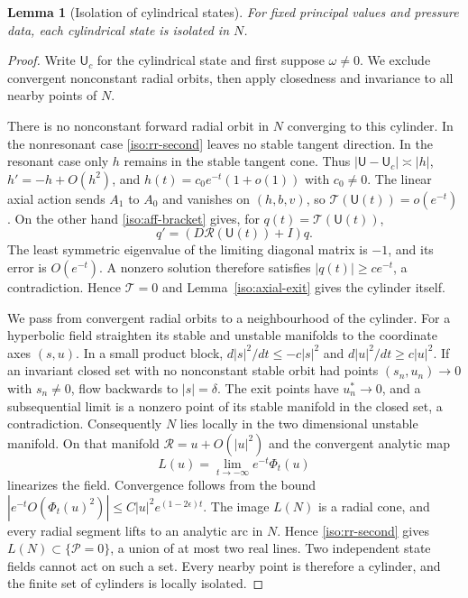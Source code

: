 \documentclass[11pt,a4paper]{article}
\numberwithin{equation}{section}
\theoremstyle{plain}
\newtheorem{lemma}[theorem]{Lemma}
\theoremstyle{definition}
\theoremstyle{remark}
\begin{document}
\begin{lemma}[Isolation of cylindrical states]\label{iso:rr-isolation}
For fixed principal values and pressure data, each cylindrical
state is isolated in $N$.
\end{lemma}
\begin{proof}
Write $\mathsf U_c$ for the cylindrical state and first suppose
$\omega\ne0$. We exclude convergent nonconstant radial orbits, then
apply closedness and invariance to all nearby points of $N$.

There is no nonconstant forward radial orbit in $N$ converging to this
cylinder.  In the nonresonant case \eqref{iso:rr-second} leaves no stable
tangent direction.  In the resonant case only $h$ remains in the stable
tangent cone.  Thus $|\mathsf U-\mathsf U_c|\asymp|h|$,
$h'=-h+O(h^2)$, and $h(t)=c_0e^{-t}(1+o(1))$ with $c_0\ne0$.
The linear axial action sends $A_1$ to $A_0$ and vanishes on $(h,b,v)$,
so $\mathcal T(\mathsf U(t))=o(e^{-t})$.
On the other hand \eqref{iso:aff-bracket} gives, for
$q(t)=\mathcal T(\mathsf U(t))$,
\begin{equation}\label{iso:rr-axial-variation}
 q'=(D\mathcal R(\mathsf U(t))+I)q.
\end{equation}
The least symmetric eigenvalue of the limiting diagonal matrix is $-1$,
and its error is $O(e^{-t})$.  A nonzero solution therefore satisfies
$|q(t)|\ge c e^{-t}$, a contradiction.  Hence $\mathcal T=0$ and
Lemma~\ref{iso:axial-exit} gives the cylinder itself.

We pass from convergent radial orbits to a neighbourhood of the cylinder.
For a hyperbolic field straighten its stable and unstable manifolds
\cite[Theorem~1.1 and Remark~6]{CabreFontichLlave2003} to
the coordinate axes $(s,u)$.  In a small product block,
$d|s|^2/dt\le-c|s|^2$ and $d|u|^2/dt\ge c|u|^2$.
If an invariant closed set with no nonconstant stable orbit had points
$(s_n,u_n)\to0$ with $s_n\ne0$, flow backwards to $|s|=\delta$.
The exit points have $u_n^*\to0$, and a subsequential limit is a nonzero
point of its stable manifold in the closed set, a contradiction.
Consequently $N$ lies locally in the two dimensional unstable manifold.
On that manifold $\mathcal R=u+O(|u|^2)$ and the convergent analytic map
\[
 L(u)=\lim_{t\to-\infty}e^{-t}\Phi_t(u)
\]
linearizes the field.  Convergence follows from the bound
$|e^{-t}O(\Phi_t(u)^2)|\le C|u|^2e^{(1-2\epsilon)t}$.
The image $L(N)$ is a radial cone, and every radial segment lifts to an
analytic arc in $N$.  Hence \eqref{iso:rr-second} gives
$L(N)\subset\{\mathscr P=0\}$, a union of at most two real lines.
Two independent state fields cannot act on such a set.  Every nearby
point is therefore a cylinder, and the finite set of cylinders is locally
isolated.


\end{proof}
\end{document}
